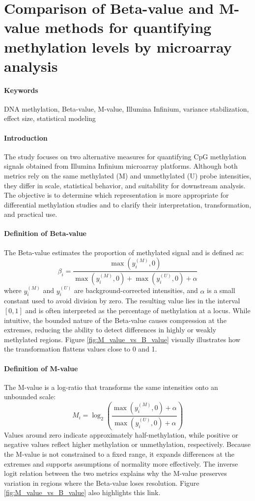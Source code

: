 \documentclass[10pt]{extarticle}
\begin{document}
\section{Comparison of Beta-value and M-value methods for quantifying methylation levels by microarray analysis}

\paragraph{Keywords} DNA methylation, Beta-value, M-value, Illumina Infinium, variance stabilization, effect size, statistical modeling \cite{Du2010}

\paragraph{Introduction}
The study focuses on two alternative measures for quantifying CpG methylation signals obtained from Illumina Infinium microarray platforms. Although both metrics rely on the same methylated (M) and unmethylated (U) probe intensities, they differ in scale, statistical behavior, and suitability for downstream analysis. The objective is to determine which representation is more appropriate for differential methylation studies and to clarify their interpretation, transformation, and practical use.

\paragraph{Definition of Beta-value}
The Beta-value estimates the proportion of methylated signal and is defined as:
\[
\beta_i = \frac{\max(y^{(M)}_i, 0)}{\max(y^{(M)}_i, 0) + \max(y^{(U)}_i, 0) + \alpha}
\]
where \(y^{(M)}_i\) and \(y^{(U)}_i\) are background-corrected intensities, and \(\alpha\) is a small constant used to avoid division by zero. The resulting value lies in the interval \([0,1]\) and is often interpreted as the percentage of methylation at a locus. While intuitive, the bounded nature of the Beta-value causes compression at the extremes, reducing the ability to detect differences in highly or weakly methylated regions. Figure \ref{fig:M_value_vs_B_value} visually illustrates how the transformation flattens values close to 0 and 1.


\paragraph{Definition of M-value}
The M-value is a log-ratio that transforms the same intensities onto an unbounded scale:
\[
M_i = \log_2 \left( \frac{\max(y^{(M)}_i, 0) + \alpha}{\max(y^{(U)}_i, 0) + \alpha} \right)
\]
Values around zero indicate approximately half-methylation, while positive or negative values reflect higher methylation or unmethylation, respectively. Because the M-value is not constrained to a fixed range, it expands differences at the extremes and supports assumptions of normality more effectively. The inverse logit relation between the two metrics explains why the M-value preserves variation in regions where the Beta-value loses resolution. Figure \ref{fig:M_value_vs_B_value} also highlights this link.
\end{document}
